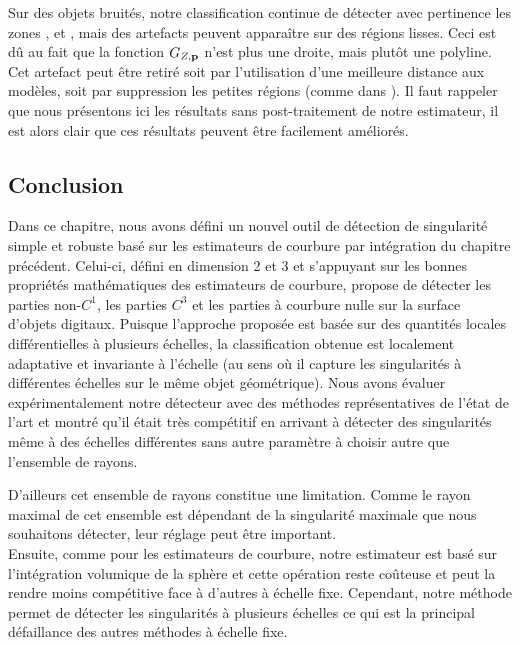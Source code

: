 Sur des objets bruités, notre classification continue de détecter avec
pertinence les zones \featedge, \featsmooth et \featflat, mais des artefacts
peuvent apparaître sur des régions lisses. Ceci est dû au fait que la fonction
$G_{Z,\mathbf{p}}$ n'est plus une droite, mais plutôt une polyline. Cet artefact peut
être retiré soit par l'utilisation d'une meilleure distance aux modèles, soit
par suppression les petites régions \featedge (comme dans \cite{Park2012}). Il
faut rappeler que nous présentons ici les résultats sans post-traitement de
notre estimateur, il est alors clair que ces résultats peuvent être facilement
améliorés.
%
\subsection{Conclusion}
%
Dans ce chapitre, nous avons défini un nouvel outil de détection de singularité
simple et robuste basé sur les estimateurs de courbure par intégration du
chapitre précédent. Celui-ci, défini en dimension 2 et 3 et s'appuyant sur les
bonnes propriétés mathématiques des estimateurs de courbure, propose de détecter
les parties non-$C^1$, les parties $C^3$ et les parties à courbure nulle sur la
surface d'objets digitaux. Puisque l'approche proposée est basée sur des
quantités locales différentielles à plusieurs échelles, la classification
obtenue est localement adaptative et invariante à l'échelle (au sens où il
capture les singularités à différentes échelles sur le même objet géométrique).
Nous avons évaluer expérimentalement notre détecteur avec des méthodes
représentatives de l'état de l'art et montré qu'il était très compétitif en
arrivant à détecter des singularités même à des échelles différentes sans autre
paramètre à choisir autre que l'ensemble de rayons.


D'ailleurs cet ensemble de rayons constitue une limitation. Comme le rayon
maximal de cet ensemble est dépendant de la singularité maximale que nous
souhaitons détecter, leur réglage peut être important. \\
%
Ensuite, comme pour les estimateurs de courbure, notre estimateur est basé sur
l'intégration volumique de la sphère et cette opération reste coûteuse et peut
la rendre moins compétitive face à d'autres à échelle fixe. Cependant, notre
méthode permet de détecter les singularités à plusieurs échelles ce qui est la
principal défaillance des autres méthodes à échelle fixe.
